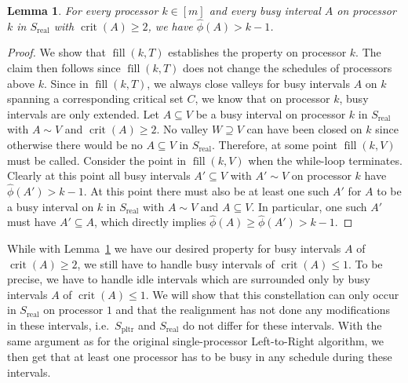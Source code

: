 \documentclass[a4paper]{article}
\DeclareMathOperator{\pltr}{pltr}
\DeclareMathOperator{\real}{real}
\DeclareMathOperator{\crit}{crit}
\DeclareMathOperator{\fillop}{fill}
\newtheorem{lemma}[theorem]{Lemma}
\begin{document}
\begin{lemma}\label{lemma:phi_prop}
  For every processor $k \in [m]$ and every busy interval $A$ on processor $k$ in $S_{\real}$ with $\crit(A) \geq 2$, we have $\hat \phi(A) > k - 1$.
\end{lemma}
\begin{proof}
  We show that $\fillop(k, T)$ establishes the property on processor $k$.
  The claim then follows since $\fillop(k, T)$ does not change the schedules of processors above $k$.
  Since in $\fillop(k, T)$, we always close valleys for busy intervals $A$ on $k$ spanning a corresponding critical set $C$, we know that on processor $k$, busy intervals are only extended.
  Let $A \subseteq V$ be a busy interval on processor $k$ in $S_{\real}$ with $A \sim V$ and $\crit(A) \geq 2$.
  No valley $W \supseteq V$ can have been closed on $k$ since otherwise there would be no $A \subseteq V$ in $S_{\real}$.
  Therefore, at some point $\fillop(k, V)$ must be called.
  Consider the point in $\fillop(k, V)$ when the while-loop terminates.
  Clearly at this point all busy intervals $A' \subseteq V$ with $A' \sim V$ on processor $k$ have $\hat \phi(A') > k - 1$.
  At this point there must also be at least one such $A'$ for $A$ to be a busy interval on $k$ in $S_{\real}$ with $A \sim V$ and $A \subseteq V$.
  In particular, one such $A'$ must have $A' \subseteq A$, which directly implies $\hat \phi(A) \geq \hat \phi(A') > k - 1$.
\end{proof}
While with Lemma~\ref{lemma:phi_prop} we have our desired property for busy intervals $A$ of $\crit(A) \geq 2$, we still have to handle busy intervals of $\crit(A) \leq 1$.
To be precise, we have to handle idle intervals which are surrounded only by busy intervals $A$ of $\crit(A) \leq 1$.
We will show that this constellation can only occur in $S_{\real}$ on processor $1$ and that the realignment has not done any modifications in these intervals, i.e.\ $S_{\pltr}$ and $S_{\real}$ do not differ for these intervals.
With the same argument as for the original single-processor Left-to-Right algorithm, we then get that at least one processor has to be busy in any schedule during these intervals.
\end{document}
